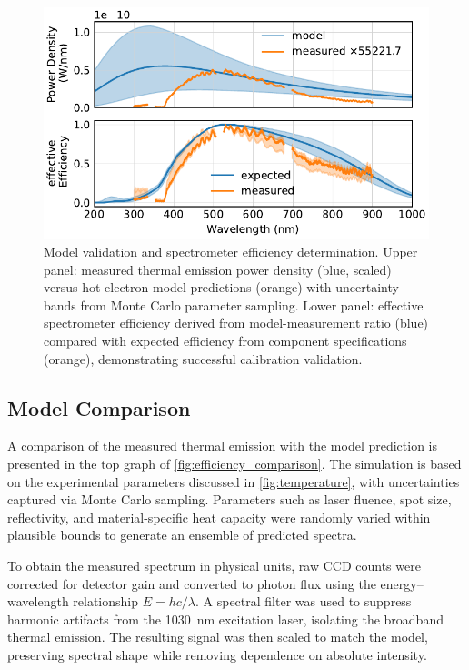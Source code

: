 \documentclass[
	parskip=half,
	a4paper,
]{scrarticle}
\begin{document}
\begin{figure}
    \centering
    \includegraphics{../analysis/figures/efficiency de.pdf}
    \caption{Model validation and spectrometer efficiency determination. Upper panel: measured thermal emission power density (blue, scaled) versus hot electron model predictions (orange) with uncertainty bands from Monte Carlo parameter sampling. Lower panel: effective spectrometer efficiency derived from model-measurement ratio (blue) compared with expected efficiency from component specifications (orange), demonstrating successful calibration validation.}
    \label{fig:efficiency_comparison}
\end{figure}

\subsection{Model Comparison}

A comparison of the measured thermal emission with the model prediction is presented in the top graph of \autoref{fig:efficiency_comparison}. The simulation is based on the experimental parameters discussed in \autoref{fig:temperature}, with uncertainties captured via Monte Carlo sampling. Parameters such as laser fluence, spot size, reflectivity, and material-specific heat capacity were randomly varied within plausible bounds to generate an ensemble of predicted spectra.

To obtain the measured spectrum in physical units, raw CCD counts were corrected for detector gain and converted to photon flux using the energy–wavelength relationship \(E = hc/\lambda\). A spectral filter was used to suppress harmonic artifacts from the \SI{1030}{nm} excitation laser, isolating the broadband thermal emission. The resulting signal was then scaled to match the model, preserving spectral shape while removing dependence on absolute intensity.
\end{document}
